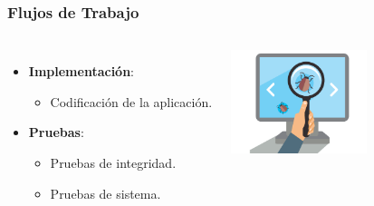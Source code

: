 \documentclass[usenames,dvipsnames]{beamer}
\begin{document}
\begin{frame}
\frametitle{Flujos de Trabajo}
\begin{columns}[c] %

\begin{itemize}
\item \textbf{Implementación}:
	\begin{itemize}
		\item Codificación de la aplicación.
	\end{itemize}
\vspace{0.5cm}
\item \textbf{Pruebas}:
	\begin{itemize}
		\item Pruebas de integridad.
		\item Pruebas de sistema.
	\end{itemize}
\end{itemize}

\vspace{-3cm}
\includegraphics[height=3cm, angle=0]{./img/testing.png}
\end{columns}
\end{frame}
\end{document}
